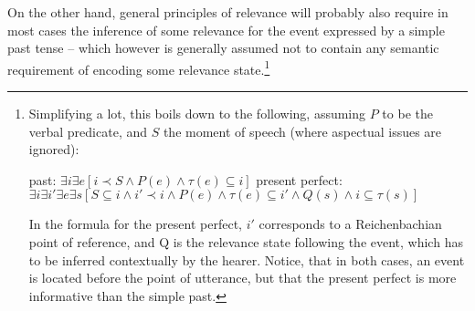 \documentclass[output=paper,hidelinks]{langscibook}
\begin{document}
On the other hand, general principles of relevance will probably also require in most cases the inference of some relevance for the event expressed by a simple past tense -- which however is generally assumed not to contain any semantic requirement of encoding some relevance state.\footnote{Simplifying a lot, this boils down to the following, assuming $P$ to be the verbal predicate, and $S$ the moment of speech (where aspectual issues are ignored):
  
  \begin{exe}
    \ex
    \begin{xlist}
      \ex past: $\exists i \exists e [ i \prec S \land P(e) \land \tau(e) \subseteq i ]$
      \ex present perfect: $\exists i \exists i' \exists e \exists s [S \subseteq i \land i' \prec i \land P(e) \land \tau(e) \subseteq i' \land Q(s) \land i \subseteq \tau(s)]$ 
    \end{xlist}
    
  \end{exe}

In the formula for the present perfect, $i'$ corresponds to a Reichenbachian point of reference, and Q is the relevance state following the event, which has to be inferred contextually by the hearer. Notice, that in both cases, an event is located before the point of utterance, but that the present perfect is more informative than the simple past.}
\end{document}
